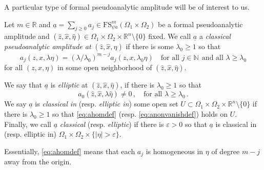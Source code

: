\documentclass[
	fontsize=11pt, 
	twoside=false, 
	abstract=true, 
	a4paper,
]{scrartcl}
\newcommand{\eps}{\varepsilon}
\newcommand{\sem}{\setminus\{0\}}
\newcommand{\RR}{\mathbb{R}}
\newcommand{\abs}[1]{\left\lvert#1\right\rvert}
\newcommand{\ud}[1]{\underline{#1}}
\begin{document}
A particular type of formal pseudoanalytic amplitude will be of interest to us.
\begin{definition}\label{def:classamp}
	Let $m\in\RR$ and $\ud{a} = \sum_{j\geq 0} a_j \in \mathrm{FS}^m_{\psi a}(\Omega_1\times\Omega_2)$ be a formal pseudoanalytic amplitude and $(\hat z, \hat x, \hat\eta) \in \Omega_1\times\Omega_2\times \RR^n\sem$ fixed. We call $\ud{a}$ a \emph{classical pseudoanalytic amplitude at} $(\hat z, \hat x, \hat\eta)$ if there is some $\lambda_0 \geq 1$ so that %
	\begin{equation}\label{eq:ahomdef}
		a_j(z, x, \lambda\eta) = (\lambda/\lambda_0)^{m-j} a_j(z, x, \lambda_0\eta)\quad\text{for all } j\in\mathbb{N}\ \ \text{and all }\lambda \geq \lambda_0
	\end{equation}
	for all $(z,x,\eta)$ in some open neighborhood of $(\hat z, \hat x, \hat\eta)$. 

	We say that $\ud{a}$ is \emph{elliptic} at $(\hat z, \hat x, \hat\eta)$, if there is $\lambda_0\geq 1$ so that 
	\begin{equation}\label{eq:anonvanishdef}
		a_0(\hat z,\hat x, \lambda\hat\eta) \neq 0\,,\quad\text{for all } \lambda \geq \lambda_0\,.
	\end{equation}
	We say $\ud{a}$ is \emph{classical in} (resp. \emph{elliptic in}) some open set $U \subset \Omega_1\times\Omega_2\times\RR^n\sem$ if there is $\lambda_0\geq 1$ so that \cref{eq:ahomdef} (resp. \cref{eq:anonvanishdef}) holds on $U$. Finally, we call $\ud{a}$ \emph{classical} (resp. \emph{elliptic}) if there is $\eps>0$ so that $\ud{a}$ is classical in (resp. elliptic in) $\Omega_1\times\Omega_2\times \{\abs{\eta}>\eps\}$.
\end{definition}
Essentially, \cref{eq:ahomdef} means that each $a_j$ is homogeneous in $\eta$ of degree $m-j$ away from the origin.
\end{document}
